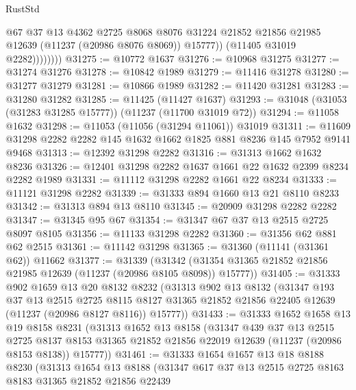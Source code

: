 \begin{lexlean}{RustStd}
\begin{coremodule}
                      @67
                      @37
                      @13
                      @4362
                      @2725
                      @8068
                      @8076
                      @31224
                      @21852
                      @21856
                      @21985
                      @12639
                      (@11237 (@20986 @8076 @8069))
                      @15777))
                  (@11405 @31019 @2282))))))))
@31275 := @10772 @1637
@31276 := @10968 @31275
@31277 := @31274 @31276
@31278 := @10842 @1989
@31279 := @11416 @31278
@31280 := @31277 @31279
@31281 := @10866 @1989
@31282 := @11420 @31281
@31283 := @31280 @31282
@31285 := @11425 (@11427 @1637)
@31293 := @31048 (@31053 (@31283 @31285 @15777)) (@11237 (@11700 @31019 @72))
@31294 := @11058 @1632
@31298 := @11053 (@11056 (@31294 @11061)) @31019
@31311 := @11609 @31298 @2282 @2282 @145 @1632 @1662 @1825 @881 @8236 @145 @7952 @9141 @9468
@31313 := @12392 @31298 @2282
@31316 := @31313 @1662 @1632 @8236
@31326 := @12401 @31298 @2282 @1637 @1661 @22 @1632 @2399 @8234 @2282 @1989
@31331 := @11112 @31298 @2282 @1661 @22 @8234
@31333 := @11121 @31298 @2282
@31339 := @31333 @894 @1660 @13 @21 @8110 @8233
@31342 := @31313 @894 @13 @8110
@31345 := @20909 @31298 @2282 @2282
@31347 := @31345 @95 @67
@31354 := @31347 @67 @37 @13 @2515 @2725 @8097 @8105
@31356 := @11133 @31298 @2282
@31360 := @31356 @62 @881 @62 @2515
@31361 := @11142 @31298
@31365 := @31360 (@11141 (@31361 @62)) @11662
@31377 := @31339
    (@31342 (@31354 @31365 @21852 @21856 @21985 @12639 (@11237 (@20986 @8105 @8098)) @15777))
@31405 := @31333
    @902
    @1659
    @13
    @20
    @8132
    @8232
    (@31313
      @902
      @13
      @8132
      (@31347
        @193
        @37
        @13
        @2515
        @2725
        @8115
        @8127
        @31365
        @21852
        @21856
        @22405
        @12639
        (@11237 (@20986 @8127 @8116))
        @15777))
@31433 := @31333
    @1652
    @1658
    @13
    @19
    @8158
    @8231
    (@31313
      @1652
      @13
      @8158
      (@31347
        @439
        @37
        @13
        @2515
        @2725
        @8137
        @8153
        @31365
        @21852
        @21856
        @22019
        @12639
        (@11237 (@20986 @8153 @8138))
        @15777))
@31461 := @31333
    @1654
    @1657
    @13
    @18
    @8188
    @8230
    (@31313
      @1654
      @13
      @8188
      (@31347
        @617
        @37
        @13
        @2515
        @2725
        @8163
        @8183
        @31365
        @21852
        @21856
        @22439

\end{coremodule}
\end{lexlean}
